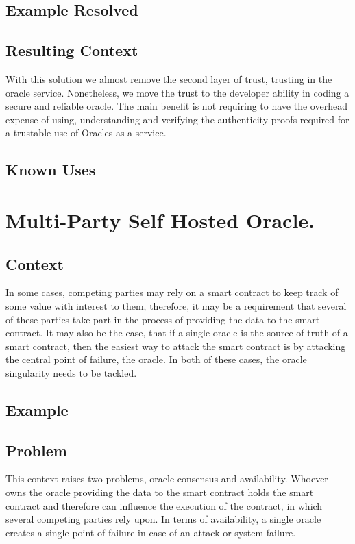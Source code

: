 \subsection{Example Resolved}
\subsection{Resulting Context}
With this solution we almost remove the second layer of trust, trusting in the oracle service. Nonetheless, we move the trust to the developer ability in coding a secure and reliable oracle. The main benefit is not requiring to have the overhead expense of using, understanding and verifying the authenticity proofs required for a trustable use of Oracles as a service.

\subsection{Known Uses}

\section{Multi-Party Self Hosted Oracle.}\label{MPSelfHostedOracle}

\subsection{Context}
In some cases, competing parties may rely on a smart contract to keep track of some value with interest to them, therefore, it may be a requirement that several of these parties take part in the process of providing the data to the smart contract. It may also be the case, that if a single oracle is the source of truth of a smart contract, then the easiest way to attack the smart contract is by attacking the central point of failure, the oracle. In both of these cases, the oracle singularity needs to be tackled.

\subsection{Example}

\subsection{Problem}
This context raises two problems, oracle consensus and availability. Whoever owns the oracle providing the data to the smart contract holds the smart contract and therefore can influence the execution of the contract, in which several competing parties rely upon. In terms of availability, a single oracle creates a single point of failure in case of an attack or system failure.

